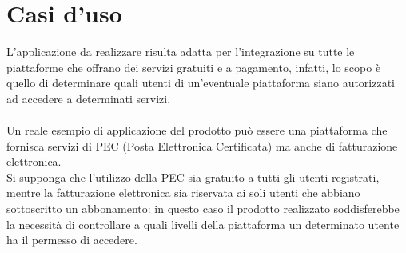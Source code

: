 \section{Casi d'uso}\label{sec:casiuso}
L'applicazione da realizzare risulta adatta per l'integrazione su tutte le piattaforme che offrano dei servizi gratuiti e a pagamento, infatti, lo scopo è quello di 
determinare quali utenti di un'eventuale piattaforma siano autorizzati ad accedere a determinati servizi.\\ \\
Un reale esempio di applicazione del prodotto può essere una piattaforma che fornisca servizi di PEC (Posta Elettronica Certificata) ma anche di fatturazione elettronica.\\
Si supponga che l'utilizzo della PEC sia gratuito a tutti gli utenti registrati, mentre la fatturazione elettronica sia riservata ai soli utenti che abbiano sottoscritto 
un abbonamento: in questo caso il prodotto realizzato soddisferebbe la necessità di controllare a quali livelli della piattaforma un determinato utente ha il permesso di accedere.
